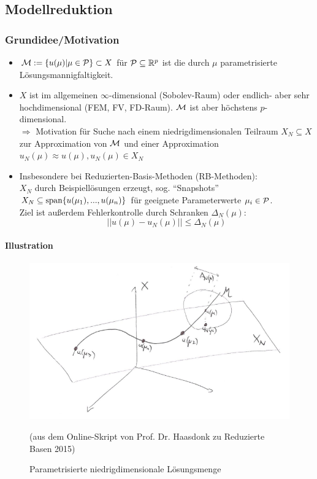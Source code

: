 \subsection{Modellreduktion}
\label{Modellreduktion}

\subsubsection*{Grundidee/Motivation}
\label{Grundidee/Motivation}

\begin{itemize}
	\item $\mathcal{M}:= \{u(\mu) | \mu \in \mathcal{P}\} \subset X$ für $\mathcal{P} \subseteq \mathbb{R}^p$ ist die durch $\mu$ parametrisierte Lösungsmannigfaltigkeit.
	\item $X$ ist im allgemeinen $\infty$-dimensional (Sobolev-Raum) oder endlich- aber  sehr hochdimensional (FEM, FV, FD-Raum). $\mathcal{M}$ ist aber höchstens $p$-dimensional. \\
	$\Rightarrow$ Motivation für Suche nach einem niedrigdimensionalen Teilraum $X_N \subseteq X$ zur Approximation von $\mathcal{M}$ und einer Approximation $u_N(\mu) \approx u(\mu), u_N(\mu) \in X_N$
	\item Insbesondere bei Reduzierten-Basis-Methoden (RB-Methoden): \\
	$X_N$ durch Beispiellösungen erzeugt, sog. "`Snapshots"' \\
	$X_N \subseteq \operatorname{span}\{u(\mu_1),...,u(\mu_n)\}$ für geeignete Parameterwerte $\mu_i \in \mathcal{P}$. \\
	Ziel ist außerdem Fehlerkontrolle durch Schranken $\Delta_N(\mu)$: \\
	\[
	||u(\mu) - u_N(\mu)|| \le \Delta_N(\mu)
	\]
\end{itemize}

\paragraph*{Illustration}

\begin{figure}[H]
  \centering\small
    \includegraphics[width = 0.7 \textwidth]{Bilder/IllustrationM.png}
  \caption{Parametrisierte niedrigdimensionale Lösungsmenge}{(aus dem Online-Skript von Prof. Dr. Haasdonk zu Reduzierte Basen 2015)}
  \label{fig:IllustrationM}
\end{figure}

